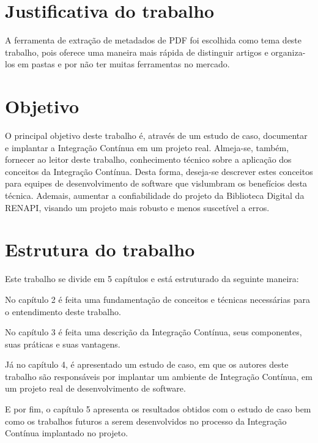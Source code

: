 \section{Justificativa do trabalho}

   A ferramenta de extração de metadados de PDF foi escolhida como tema deste trabalho, pois oferece uma maneira mais rápida de distinguir artigos e organiza-los em pastas e por não ter muitas ferramentas no mercado.


\section{Objetivo}

O principal objetivo deste trabalho é, através de um estudo de caso, documentar e implantar a Integração Contínua em um projeto real. Almeja-se, também, fornecer ao leitor deste trabalho, conhecimento técnico sobre a aplicação dos conceitos da Integração Contínua. Desta forma, deseja-se descrever estes conceitos para equipes de desenvolvimento de software que vislumbram os benefícios desta técnica. Ademais, aumentar a confiabilidade do projeto da Biblioteca Digital da RENAPI, visando um projeto mais robusto e menos suscetível a erros.

\section{Estrutura do trabalho}

Este trabalho se divide em 5 capítulos e está estruturado da seguinte maneira:

No capítulo 2 é feita uma fundamentação de conceitos e técnicas necessárias para o entendimento deste trabalho.

No capítulo 3 é feita uma descrição da Integração Contínua, seus componentes, suas práticas e suas vantagens.

Já no capítulo 4, é apresentado um estudo de caso, em que os autores deste trabalho são responsáveis por implantar um ambiente de Integração Contínua, em um projeto real de desenvolvimento de software.

E por fim, o capítulo 5 apresenta os resultados obtidos com o estudo de caso bem como os trabalhos futuros a serem desenvolvidos no processo da Integração Contínua implantado no projeto.
